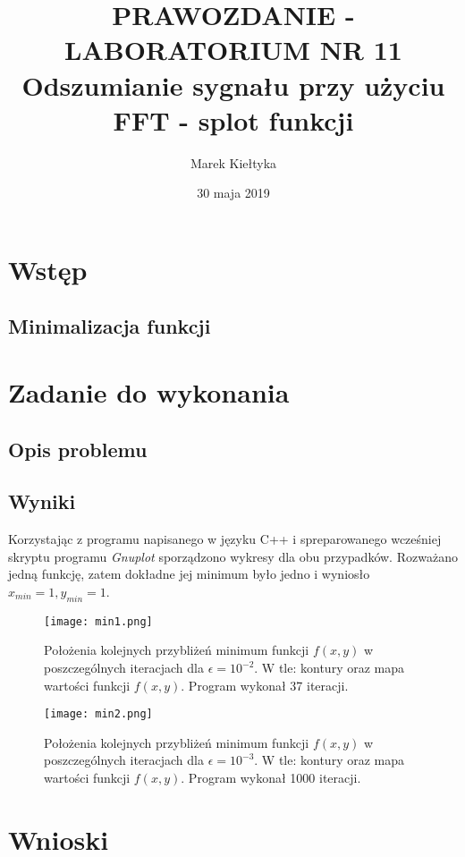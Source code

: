 

\renewcommand{\arraystretch}{1.2}

\title{\Large\vspace{-2.5cm}{\Huge S}PRAWOZDANIE - LABORATORIUM NR {\Huge11}\\
	\textbf{Odszumianie sygnału przy użyciu FFT - splot funkcji} } 
\date{\Large30 maja 2019}
\author{\Large Marek Kiełtyka}


\maketitle

\vspace{-1.2cm}\section{Wstęp}

\subsection{Minimalizacja funkcji}


\newpage
\section{Zadanie do wykonania}

\subsection{Opis problemu}




\newpage
\subsection{Wyniki}

Korzystając z programu napisanego w języku C++ i spreparowanego wcześniej skryptu programu \textit{Gnuplot} sporządzono wykresy dla obu przypadków. Rozważano jedną funkcję, zatem dokładne jej minimum było jedno i wyniosło $ x_{min} = 1, y_{min} = 1 $.
\begin{figure}[h!]
	\begin{center}
		\texttt{[image: min1.png]}
	\caption{Położenia kolejnych przybliżeń minimum funkcji $ f(x, y) $ w poszczególnych iteracjach dla $\epsilon = 10^{-2} $. W tle: kontury oraz mapa wartości funkcji $ f(x, y) $. Program wykonał 37 iteracji.}
	\label{pierwszy} 
	\end{center}
\end{figure}
\begin{figure}[h!]
	\begin{center}
	\texttt{[image: min2.png]}
	\caption{Położenia kolejnych przybliżeń minimum funkcji $ f(x, y) $ w poszczególnych iteracjach dla $\epsilon = 10^{-3} $. W tle: kontury oraz mapa wartości funkcji $ f(x, y) $. Program wykonał 1000 iteracji.}
	\label{drugi} 
\end{center}
\end{figure}

\newpage
\section{Wnioski}


